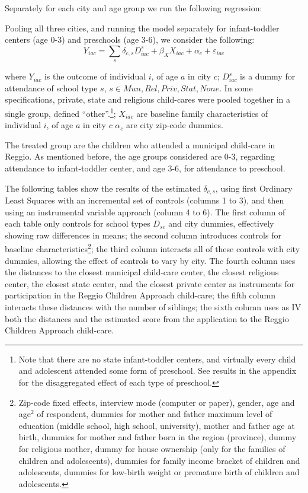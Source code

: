 \begin{table}[H]
\begin{table}[H]
\begin{table}[H]
\begin{table}[H]
\begin{table}[H]
\begin{table}[H]
Separately for each city and age group we run the following regression:

Pooling all three cities, and running the model separately for infant-toddler centers (age 0-3) and preschools (age 3-6), we consider the following:
\[ Y_{iac} = \sum_{s} \delta_{c,s} D^{s}_{iac} + \beta_{X}X_{iac} + \alpha_{c} + \varepsilon_{iac} \]

where $Y_{iac}$ is the outcome of individual $i$, of age $a$ in city $c$; 
$D^{s}_{iac}$ is a dummy for attendance of school type $s$, $s \in Mun, Rel, Priv, Stat, None$. In some specifications, private, state and religious child-cares were pooled together in a single group, defined ``other''.\footnote{Note that there are no state infant-toddler centers, and virtually every child and adolescent attended some form of preschool. See results in the appendix for the disaggregated effect of each type of preschool.};
$X_{iac}$ are baseline family characteristics of individual $i$, of age $a$ in city $c$ 
$\alpha_{c}$ are city zip-code dummies.

The treated group are the children who attended a municipal child-care in Reggio.
As mentioned before, the age groups considered are 0-3, regarding attendance to infant-toddler center, and age 3-6, for attendance to preschool. 

The following tables show the results of the estimated $\delta_{c,s}$, using first Ordinary Least Squares with an incremental set of controls (columns 1 to 3), and then using an instrumental variable approach (column 4 to 6). The first column of each table only controls for school types $D_{sc}$ and city dummies, effectively showing raw differences in means; the second column introduces controls for baseline characteristics\footnote{Zip-code fixed effects, interview mode (computer or paper), gender, age and age$^2$ of respondent, dummies for mother and father maximum level of education (middle school, high school, university), mother and father age at birth, dummies for mother and father born in the region (province), dummy for religious mother, dummy for house ownership (only for the families of children and adolescents), dummies for family income bracket of children and adolescents, dummies for low-birth weight or premature birth of children and adolescents.}; the third column interacts all of these controls with city dummies, allowing the effect of controls to vary by city.
The fourth column uses the distances to the closest municipal child-care center, the closest religious center, the closest state center, and the closest private center as instruments for participation in the Reggio Children Approach child-care; the fifth column interacts these distances with the number of siblings; the sixth column uses as IV both the distances and the estimated score from the application to the Reggio Children Approach child-care.


\end{table}
\end{table}
\end{table}
\end{table}
\end{table}
\end{table}
